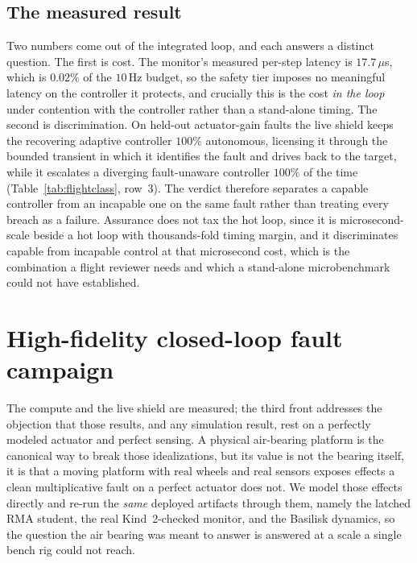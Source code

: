 \documentclass[journal]{IEEEtran}
\begin{document}
\subsection{The measured result} Two numbers come out of the integrated loop, and each answers a
distinct question. The first is cost. The monitor's measured per-step latency is $17.7\,\mu$s,
which is $0.02\%$ of the $10$\,Hz budget, so the safety tier imposes no meaningful latency on the
controller it protects, and crucially this is the cost \emph{in the loop} under contention with
the controller rather than a stand-alone timing. The second is discrimination. On held-out
actuator-gain faults the live shield keeps the recovering adaptive controller $100\%$ autonomous,
licensing it through the bounded transient in which it identifies the fault and drives back to the
target, while it escalates a diverging fault-unaware controller $100\%$ of the time
(Table~\ref{tab:flightclass}, row~3). The verdict therefore separates a capable controller from an
incapable one on the same fault rather than treating every breach as a failure. Assurance does not
tax the hot loop, since it is microsecond-scale beside a hot loop with thousands-fold timing
margin, and it discriminates capable from incapable control at that microsecond cost, which is the
combination a flight reviewer needs and which a stand-alone microbenchmark could not have
established.

\section{High-fidelity closed-loop fault campaign}
\label{sec:hifi}
The compute and the live shield are measured; the third front addresses the objection that those
results, and any simulation result, rest on a perfectly modeled actuator and perfect sensing. A
physical air-bearing platform is the canonical way to break those idealizations, but its value is
not the bearing itself, it is that a moving platform with real wheels and real sensors exposes
effects a clean multiplicative fault on a perfect actuator does not. We model those effects
directly and re-run the \emph{same} deployed artifacts through them, namely the latched RMA
student, the real Kind~2-checked monitor, and the Basilisk dynamics, so the question the air
bearing was meant to answer is answered at a scale a single bench rig could not reach.
\end{document}
